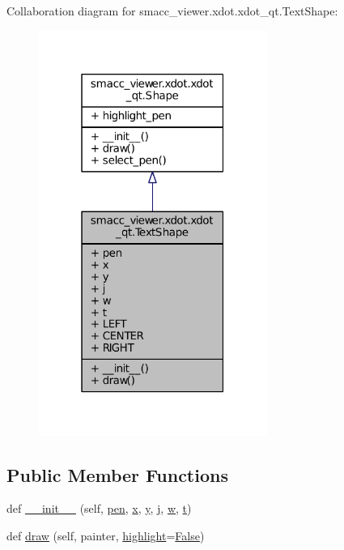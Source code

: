 Collaboration diagram for smacc\+\_\+viewer.\+xdot.\+xdot\+\_\+qt.\+Text\+Shape\+:
\nopagebreak
\begin{figure}[H]
\begin{center}
\leavevmode
\includegraphics[width=211pt]{classsmacc__viewer_1_1xdot_1_1xdot__qt_1_1TextShape__coll__graph}
\end{center}
\end{figure}
\subsection*{Public Member Functions}
\begin{DoxyCompactItemize}
\item 
def \hyperlink{classsmacc__viewer_1_1xdot_1_1xdot__qt_1_1TextShape_ad120602460321e214f2664b5491a91bf}{\+\_\+\+\_\+init\+\_\+\+\_\+} (self, \hyperlink{classsmacc__viewer_1_1xdot_1_1xdot__qt_1_1TextShape_aa707273f46372937ec96b59762d82a4f}{pen}, \hyperlink{classsmacc__viewer_1_1xdot_1_1xdot__qt_1_1TextShape_a5ef1c12aaeabfc80fbe893b6a5f9c3d3}{x}, \hyperlink{classsmacc__viewer_1_1xdot_1_1xdot__qt_1_1TextShape_ae50d05feb01bc8e1544cb9c8c6a312f1}{y}, \hyperlink{classsmacc__viewer_1_1xdot_1_1xdot__qt_1_1TextShape_ad6bf2920b8d24b22adcb27df075a1837}{j}, \hyperlink{classsmacc__viewer_1_1xdot_1_1xdot__qt_1_1TextShape_a7af76f9d10ceafd1209cf7bfce73c7be}{w}, \hyperlink{classsmacc__viewer_1_1xdot_1_1xdot__qt_1_1TextShape_a355e76c951da6ca7af4a69b6eaeea2e8}{t})
\item 
def \hyperlink{classsmacc__viewer_1_1xdot_1_1xdot__qt_1_1TextShape_a537309c0d79757c555e79cfb190be5ec}{draw} (self, painter, \hyperlink{namespacesmacc__viewer_1_1xdot_1_1xdot__qt_ab7970f10809cac5c23ebf9c6badb6d79}{highlight}=\hyperlink{namespacesmacc__viewer_a5928e8da279785cbab9011356c3eaa87}{False})
\end{DoxyCompactItemize}
